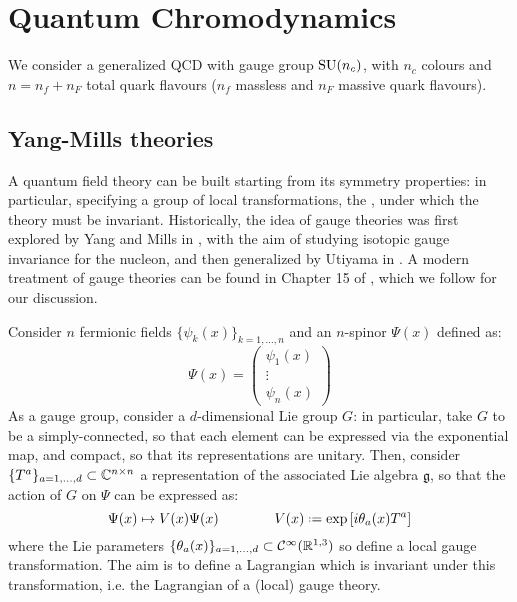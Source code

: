 
\section{Quantum Chromodynamics}
We consider a generalized QCD with gauge group $ \mathrm{SU}(n_c) $, with $ n_c $ colours and $ n = n_f + n_F $ total quark flavours ($ n_f $ massless and $ n_F $ massive quark flavours).

\subsection{Yang-Mills theories}
\label{ssec:gauge-th}

A quantum field theory can be built starting from its symmetry properties: in particular, specifying a group of local transformations, the , under which the theory must be invariant. Historically, the idea of gauge theories was first explored by Yang and Mills in \cite{Yang-1954}, with the aim of studying isotopic gauge invariance for the nucleon, and then generalized by Utiyama in \cite{Utiyama-1956}. A modern treatment of gauge theories can be found in Chapter 15 of \cite{Peskin-1995}, which we follow for our discussion.

Consider $ n $ fermionic fields $ \{\psi_k(x)\}_{k = 1, \dots, n} $ and an $ n $-spinor $ \Psi(x) $ defined as:
\begin{equation}
  \Psi(x) =
  \begin{pmatrix}
    \psi_1(x) \\ \vdots \\ \psi_n(x)
  \end{pmatrix}
\end{equation}
As a gauge group, consider a $ d $-dimensional Lie group $ G $: in particular, take $ G $ to be a simply-connected, so that each element can be expressed via the exponential map, and compact, so that its representations are unitary. Then, consider $ \{T^a\}_{a = 1, \dots, d} \subset \mathbb{C}^{n \times n} $ a representation of the associated Lie algebra $ \mathfrak{g} $, so that the action of $ G $ on $ \Psi $ can be expressed as:
\begin{equation}
  \Psi(x) \mapsto V(x) \Psi(x)
  \qquad \qquad
  V(x) \defeq \exp \left[ i \theta_a(x) T^a \right]
  \label{eq:gauge-trans}
\end{equation}
where the Lie parameters $ \{\theta_a(x)\}_{a = 1, \dots, d} \subset \mathcal{C}^\infty(\mathbb{R}^{1,3}) $ so define a local gauge transformation. The aim is to define a Lagrangian which is invariant under this transformation, i.e. the Lagrangian of a (local) gauge theory.

